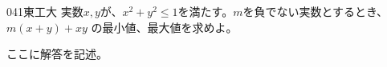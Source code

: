 \begin{thm}{041}{}{東工大}
 実数$x,y$が、$x^2+y^2\le 1$を満たす。$m$を負でない実数とするとき、$m(x+y)+xy$ の最小値、最大値を求めよ。
\end{thm}

ここに解答を記述。